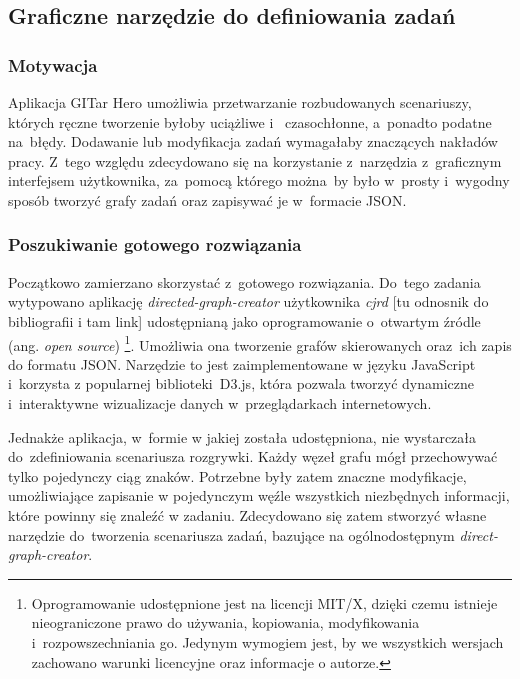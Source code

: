 \documentclass[12pt,a4paper,polish,thesis]{dcsbook}
\begin{document}
{	\subsection{Graficzne narzędzie do definiowania zadań}

	\subsubsection{Motywacja}

	Aplikacja GITar Hero umożliwia przetwarzanie rozbudowanych scenariuszy, których ręczne tworzenie byłoby uciążliwe i ~czasochłonne, a~ponadto podatne na~błędy. Dodawanie lub modyfikacja zadań wymagałaby znaczących nakładów pracy.
	Z~tego względu zdecydowano się na korzystanie z~narzędzia z~graficznym interfejsem użytkownika, za~pomocą którego można~by było w~prosty i~wygodny sposób tworzyć grafy zadań oraz zapisywać je w~formacie JSON.

	\subsubsection{Poszukiwanie gotowego rozwiązania} \label{solution}

	Początkowo zamierzano skorzystać z~gotowego rozwiązania. Do~tego zadania wytypowano aplikację \textit{directed-graph-creator} użytkownika \textit{cjrd} [tu odnosnik do bibliografii i tam link] udostępnianą jako oprogramowanie o~otwartym źródle (ang. \textit{open source}) \footnote{Oprogramowanie udostępnione jest na licencji MIT/X, dzięki czemu istnieje nieograniczone prawo do używania, kopiowania, modyfikowania i~rozpowszechniania go. Jedynym wymogiem jest, by we wszystkich wersjach zachowano warunki licencyjne oraz informacje o autorze.}. Umożliwia ona tworzenie grafów skierowanych oraz~ich zapis do formatu JSON. Narzędzie to jest zaimplementowane w języku JavaScript i~korzysta z popularnej biblioteki~D3.js, która pozwala tworzyć dynamiczne i~interaktywne wizualizacje danych w~przeglądarkach internetowych.

	Jednakże aplikacja, w~formie w jakiej została udostępniona, nie wystarczała do~zdefiniowania scenariusza rozgrywki. Każdy węzeł grafu mógł przechowywać tylko pojedynczy ciąg znaków. Potrzebne były zatem znaczne modyfikacje, umożliwiające zapisanie w pojedynczym węźle wszystkich niezbędnych informacji, które powinny się znaleźć w zadaniu. Zdecydowano się zatem stworzyć własne narzędzie do~tworzenia scenariusza zadań, bazujące na ogólnodostępnym \textit{direct-graph-creator}.

}
\end{document}
